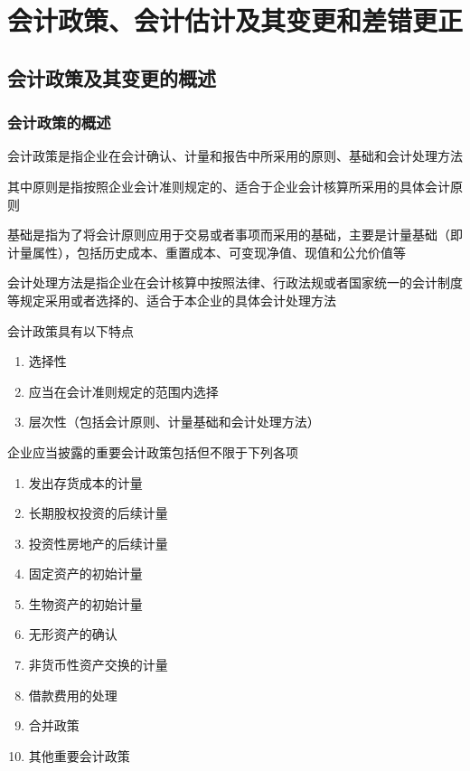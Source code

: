 \documentclass[UTF8,12pt]{ctexart}
\numberwithin{equation}{section} %
\numberwithin{figure}{section}
\numberwithin{table}{section}
\begin{document}
	\section{会计政策、会计估计及其变更和差错更正}
	
	\subsection{会计政策及其变更的概述}
	\subsubsection{会计政策的概述}
	会计政策是指企业在会计确认、计量和报告中所采用的原则、基础和会计处理方法
	
	其中原则是指按照企业会计准则规定的、适合于企业会计核算所采用的具体会计原则
	
	基础是指为了将会计原则应用于交易或者事项而采用的基础，主要是计量基础（即计量属性），包括历史成本、重置成本、可变现净值、现值和公允价值等
	
	会计处理方法是指企业在会计核算中按照法律、行政法规或者国家统一的会计制度等规定采用或者选择的、适合于本企业的具体会计处理方法
	
	会计政策具有以下特点
	\begin{enumerate}
		\item 选择性
		
		\item 应当在会计准则规定的范围内选择
		
		\item 层次性（包括会计原则、计量基础和会计处理方法）
	\end{enumerate}
	
	企业应当披露的重要会计政策包括但不限于下列各项
	\begin{enumerate}
		\item 发出存货成本的计量
		
		\item 长期股权投资的后续计量
		
		\item 投资性房地产的后续计量
		
		\item 固定资产的初始计量
		
		\item 生物资产的初始计量
		
		\item 无形资产的确认
		
		\item 非货币性资产交换的计量
		
		\item 借款费用的处理
		
		\item 合并政策
		
		\item 其他重要会计政策
	\end{enumerate}
	
\end{document}
